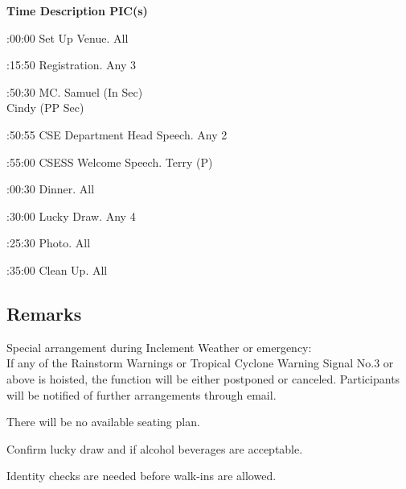\setupTABLE[c][1][width=1.25in]
\setupTABLE[c][2][width=3.5in]
\setupTABLE[c][3][width=1.25in]
\bTABLE
\bTABLEhead

\bTR\bTH    \bf{Time}
\eTH\bTH    \bf{Description}
\eTH\bTH    \bf{PIC(s)}
\eTH\eTR

\eTABLEhead
\bTABLEbody

\bTR{}:00:00
\eTD\bTD Set Up Venue.
\eTD\bTD All
\eTD\eTR

\bTR{}:15:50
\eTD\bTD Registration.
\eTD\bTD Any 3
\eTD\eTR

\bTR{}:50:30
\eTD\bTD MC.
\eTD\bTD Samuel (In Sec) \\ Cindy (PP Sec)
\eTD\eTR

\bTR{}:50:55
\eTD\bTD CSE Department Head Speech.
\eTD\bTD Any 2
\eTD\eTR

\bTR{}:55:00
\eTD\bTD CSESS Welcome Speech.
\eTD\bTD Terry (P)
\eTD\eTR

\bTR{}:00:30
\eTD\bTD Dinner.
\eTD\bTD All
\eTD\eTR

\bTR{}:30:00
\eTD\bTD Lucky Draw.
\eTD\bTD Any 4
\eTD\eTR

\bTR{}:25:30
\eTD\bTD Photo.
\eTD\bTD All
\eTD\eTR

\bTR{}:35:00
\eTD\bTD Clean Up.
\eTD\bTD All
\eTD\eTR

\eTABLEbody
\eTABLE

\subsection{Remarks}
\startitemize
\item Special arrangement during Inclement Weather or emergency: \\
If any of the Rainstorm Warnings or Tropical Cyclone Warning Signal No.3 or above is hoisted, the function will be either postponed or canceled. Participants will be notified of further arrangements through email.
\item There will be no available seating plan.
\item Confirm lucky draw and if alcohol beverages are acceptable.
\item Identity checks are needed before walk-ins are allowed.
\stopitemize

\stopsection
\pagebreak
